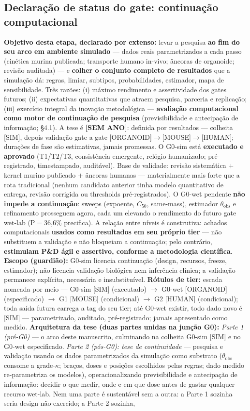 \documentclass[10pt,twocolumn]{article}
\begin{document}
\subsection{Declaração de status do gate: continuação computacional}
\textbf{Objetivo desta etapa, declarado por extenso:} levar a pesquisa \textbf{ao fim do seu arco em ambiente simulado} --- dados reais parametrizados a cada passo (cinética murina publicada; transporte humano in-vivo; âncoras de organoide; revisão auditada) --- e \textbf{colher o conjunto completo de resultados} que a simulação dá: regras, limiar, subtipos, probabilidades, estimador, mapa de sensibilidade. Três razões: (i) máximo rendimento e assertividade dos gates futuros; (ii) expectativas quantitativas que atraem pesquisa, parceria e replicação; (iii) exercício integral da inovação metodológica --- \textbf{avaliação computacional como motor de continuação de pesquisa} (previsibilidade e antecipação de informação; \S4.1). A tese é \textbf{[SEM ANO]}: definida por resultados --- colheita [SIM], depois validação gate a gate [ORGANOID]$\to$[MOUSE]$\to$[HUMAN]; durações de fase são estimativas, jamais promessas. O G0-sim está \textbf{executado e aprovado} (T1/T2/T3, consistência emergente, relógio humanizado; pré-registrado, timestampado, auditável). Base de validade: revisão sistemática $+$ kernel murino publicado $+$ âncoras humanas --- materialmente mais forte que a rota tradicional (nenhum candidato anterior tinha modelo quantitativo de entrega, revisão corrigida ou thresholds pré-registrados). O G0-wet pendente \textbf{não impede a continuação}: sweeps (expoente, $C_{50}$, same-mass), estimador $\theta_{\text{obs}}$ e refinamento prosseguem agora, cada um elevando o rendimento do futuro gate wet-lab (P$=$36,6\% precifica). A relação entre níveis é construtiva: achados computacionais \textbf{usados como resultados em seu próprio tier} --- não substituem a validação e não bloqueiam a continuação; pelo contrário, \textbf{estimulam P\&D ágil e assertivo, conforme a metodologia científica}. \textbf{Escopo (guardião):} G0-sim licencia continuação (design, recursos, freeze, estimador); não licencia validação biológica nem inferência clínica; a validação permanece explícita, necessária e insubstituível. \textbf{Rótulos de tier:} escada nomeada por meio --- G0-sim [SIM] (executado) $\to$ G0-wet [ORGANOID] (especificado) $\to$ G1 [MOUSE] (condicional) $\to$ G2 [HUMAN] (condicional); toda saída futura carrega a tag do seu tier; até G0-wet existir, todo dado novo é [SIM] --- parametrizado, auditado, pré-registrado; jamais apresentado como medido. \textbf{Arquitetura da tese (duas partes unidas na junção G0):} \emph{Parte 1 (pré-G0)} --- o arco deste manuscrito, culminando na colheita G0-sim [SIM] e no G0-wet especificado. \emph{Parte 2 (pós-G0): tese de continuidade} --- pesquisa e validação usando os dados parametrizados da simulação como substrato ($\theta_{\text{obs}}$ consome a grade-$\kappa$; braços, doses e posições escolhidos pelas regras; dado medido re-parametriza os modelos), operacionalizando previsibilidade e antecipação de informação: decidir o que medir, onde e em que dose antes de gastar qualquer recurso wet-lab. Nem uma parte é sustentável sem a outra: a Parte 1 sozinha seria design não-exercido; a Parte 2 sozinha, 
\end{document}
